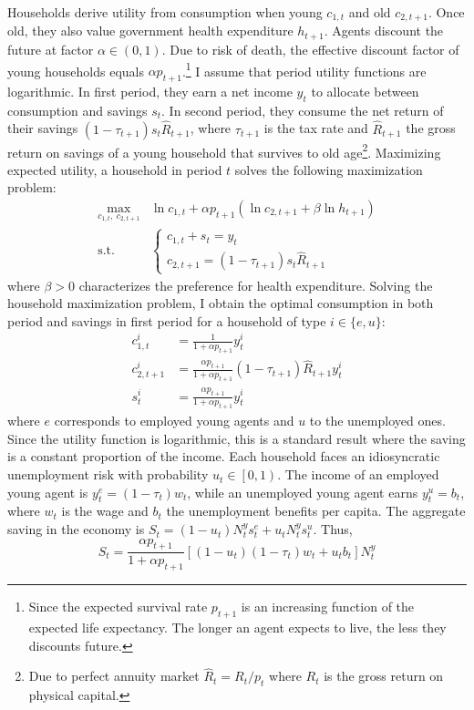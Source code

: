 \documentclass[
]{article}
\begin{document}
Households derive utility from consumption when young \(c_{1,t}\) and old \(c_{2,t+1}\). Once old, they also value government health expenditure \(h_{t+1}\). Agents discount the future at factor \(\alpha \in \left(0,1\right)\). Due to risk of death, the effective discount factor of young households equals \(\alpha p_{t+1}\).\footnote{Since the expected survival rate \(p_{t+1}\) is an increasing function of the expected life expectancy. The longer an agent expects to live, the less they discounts future.} I assume that period utility functions are logarithmic. In first period, they earn a net income \(y_t\) to allocate between consumption and savings \(s_t\). In second period, they consume the net return of their savings \((1-\tau_{t+1}) s_t \hat{R}_{t+1}\), where \(\tau_{t+1}\) is the tax rate and \(\hat{R}_{t+1}\) the gross return on savings of a young household that survives to old age\footnote{Due to perfect annuity market \(\hat{R}_t = R_t/p_t\) where \(R_t\) is the gross return on physical capital.}. Maximizing expected utility, a household in period \(t\) solves the following maximization problem:
\begin{align*}
  \max_{c_{1,t},~c_{2,t+1}} &\ln c_{1,t} + \alpha p_{t+1}\left( \ln c_{2,t+1} + \beta \ln h_{t+1} \right)\\
    \text{s.t.} ~~ & \begin{cases}
    c_{1,t} + s_t = y_t \\
    c_{2,t+1} = (1-\tau_{t+1}) s_t \hat{R}_{t+1}
    \end{cases}
\end{align*}
where \(\beta>0\) characterizes the preference for health expenditure. Solving the household maximization problem, I obtain the optimal consumption in both period and savings in first period for a household of type \(i \in \lbrace e, u \rbrace\):
\begin{align*}
  c^i_{1,t} &= \frac{1}{1+\alpha p_{t+1}} y^i_{t} \\
    c^i_{2,t+1} &= \frac{\alpha p_{t+1}}{1+\alpha p_{t+1}}(1-\tau_{t+1})\hat{R}_{t+1}y^i_{t} \\
    s^i_t &= \frac{\alpha p_{t+1}}{1+\alpha p_{t+1}} y^i_t
\end{align*}
where \(e\) corresponds to employed young agents and \(u\) to the unemployed ones.
Since the utility function is logarithmic, this is a standard result where the saving is a constant proportion of the income.
Each household faces an idiosyncratic unemployment risk with probability \(u_t \in \left[0,1\right)\). The income of an employed young agent is \(y^e_t = (1-\tau_t)w_t\), while an unemployed young agent earns \(y^u_t = b_t\), where \(w_t\) is the wage and \(b_t\) the unemployment benefits per capita. The aggregate saving in the economy is \(S_t = (1-u_t) N_t^y s^e_t + u_t N_t^y s^u_t\). Thus,
\begin{equation}
  S_t = \frac{\alpha p_{t+1}}{1+\alpha p_{t+1}}\left[ (1-u_t)(1-\tau_t)w_t + u_t b_t \right] N_t^y \label{eq:agg-saving}
\end{equation}
\end{document}
